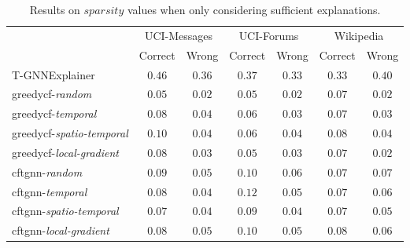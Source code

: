 \begin{table}[ht]
    \centering
    \small
    \begin{tabular}{lcccccc}
    \hline
         &  \multicolumn{2}{c}{UCI-Messages}&  \multicolumn{2}{c}{UCI-Forums}&  \multicolumn{2}{c}{Wikipedia}\\
         &  Correct&  Wrong&  Correct&  Wrong&  Correct& Wrong\\
         \hline
         T-GNNExplainer&  $0.46$&  $0.36$&  $0.37$&  $0.33$&  $0.33$& $0.40$\\
         \gls{greedycf}-\textit{random}&  $0.05$&  $0.02$&  $0.05$&  $0.02$&  $0.07$& $0.02$\\
         \gls{greedycf}-\textit{temporal}&  $0.08$&  $0.04$&  $0.06$&  $0.03$&  $0.07$& $0.03$\\
         \gls{greedycf}-\textit{spatio-temporal}&  $0.10$&  $0.04$&  $0.06$&  $0.04$&  $0.08$& $0.04$\\
         \gls{greedycf}-\textit{local-gradient}&  $0.08$&  $0.03$&  $0.05$&  $0.03$&  $0.07$& $0.02$\\
         \gls{cftgnn}-\textit{random}&  $0.09$&  $0.05$&  $0.10$&  $0.06$&  $0.07$& $0.07$\\
         \gls{cftgnn}-\textit{temporal}&  $0.08$&  $0.04$&  $0.12$&  $0.05$&  $0.07$& $0.06$\\
         \gls{cftgnn}-\textit{spatio-temporal}&  $0.07$&  $0.04$&  $0.09$&  $0.04$&  $0.07$& $0.05$\\
 \gls{cftgnn}-\textit{local-gradient}& $0.08$& $0.05$& $0.10$& $0.05$& $0.08$&$0.06$\\
 \hline
    \end{tabular}
    \caption{Results on $sparsity$ values when only considering sufficient explanations.}
    \label{t_spar_suf}
\end{table}

\fi